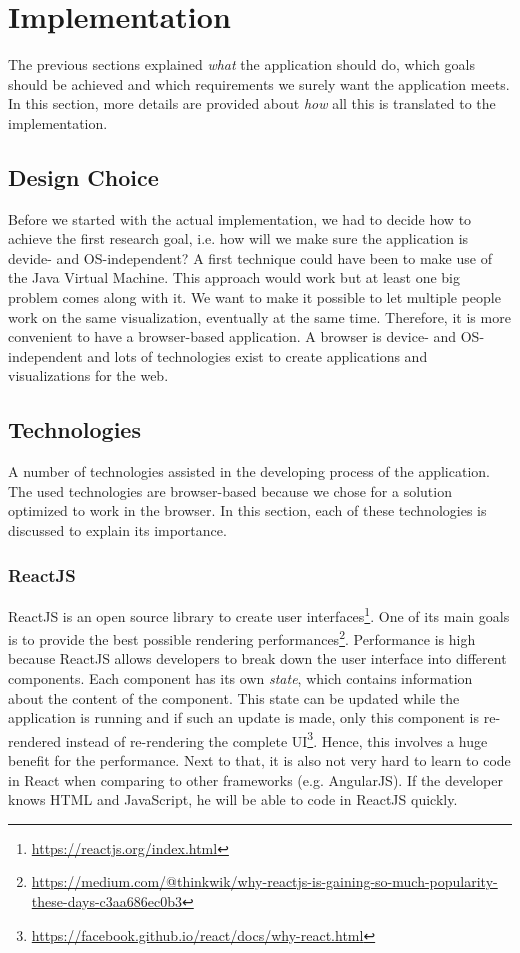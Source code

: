 \chapter{Implementation}\label{ch:implementation}

The previous sections explained \textit{what} the application should do, which goals should be achieved and which requirements we surely want the application meets. In this section, more details are provided about \textit{how} all this is translated to the implementation.

\section{Design Choice}
Before we started with the actual implementation, we had to decide how to achieve the first research goal, i.e. how will we make sure the application is devide- and OS-independent? A first technique could have been to make use of the Java Virtual Machine. This approach would work but at least one big problem comes along with it. We want to make it possible to let multiple people work on the same visualization, eventually at the same time. Therefore, it is more convenient to have a browser-based application. A browser is device- and OS-independent and lots of technologies exist to create applications and visualizations for the web.

\section{Technologies}\label{sec:technologies}
A number of technologies assisted in the developing process of the application. The used technologies are browser-based because we chose for a solution optimized to work in the browser. In this section, each of these technologies is discussed to explain its importance.

\subsection{ReactJS}\label{sec:reactjs}
ReactJS is an open source library to create user interfaces\footnote{\url{https://reactjs.org/index.html}}. One of its main goals is to provide the best possible rendering performances\footnote{\url{https://medium.com/@thinkwik/why-reactjs-is-gaining-so-much-popularity-these-days-c3aa686ec0b3}}. Performance is high because ReactJS allows developers to break down the user interface into different components. Each component has its own \textit{state}, which contains information about the content of the component. This state can be updated while the application is running and if such an update is made, only this component is re-rendered instead of re-rendering the complete UI\footnote{\url{https://facebook.github.io/react/docs/why-react.html}}. Hence, this involves a huge benefit for the performance. Next to that, it is also not very hard to learn to code in React when comparing to other frameworks (e.g. AngularJS). If the developer knows HTML and JavaScript, he will be able to code in ReactJS quickly.\\

